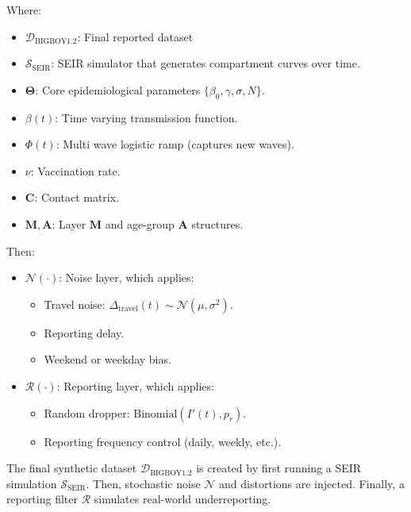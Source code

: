 \documentclass[11pt,a4paper]{article}
\theoremstyle{remark}\newtheorem{remark}{Remark}
\begin{document}
Where: 
\begin{itemize}
    \item $\mathcal{D}_{\text{BIGBOY1.2}}$: Final reported dataset
    \item $\mathcal{S}_{\text{SEIR}}$:  SEIR simulator that generates compartment curves over time.
    \item $\boldsymbol{\Theta}$: Core epidemiological parameters  $\{\beta_0, \gamma, \sigma, N\}$.
    \item $\beta(t)$: Time varying transmission function.
    \item $\Phi(t)$: Multi wave logistic ramp (captures new waves).
    \item $\nu$: Vaccination rate.
    \item $\mathbf{C}$: Contact matrix.
    \item $\mathbf{M}, \mathbf{A}$: Layer $\mathbf{M}$ and age-group $\mathbf{A}$ structures.
\end{itemize}

Then:
\begin{itemize}
    \item $\mathcal{N}(\cdot)$: Noise layer, which applies:
    \begin{itemize}
        \item Travel noise: $\Delta_{\text{travel}}(t) \sim \mathcal{N}(\mu, \sigma^2)$.
        \item Reporting delay.
        \item Weekend or weekday bias.
    \end{itemize}
    \item $\mathcal{R}(\cdot)$: Reporting layer, which applies:
    \begin{itemize}
        \item Random dropper: $\text{Binomial}(I'(t), p_r)$.
        \item Reporting frequency control (daily, weekly, etc.).
    \end{itemize}
\end{itemize}
The final synthetic dataset $\mathcal{D}_{\text{BIGBOY1.2}}$ is created by first running a SEIR simulation $\mathcal{S}_{\text{SEIR}}$. Then, stochastic noise $\mathcal{N}$ and distortions are injected. Finally, a reporting filter $\mathcal{R}$ simulates real-world underreporting.
\end{document}
